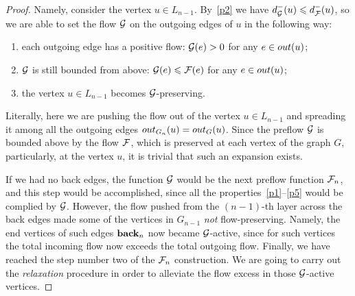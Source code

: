 \documentclass[12pt,oneside,a4paper]{amsart}
\begin{document}
\begin{proof}
        Namely, consider the vertex $u \in L_{n-1}$.
        By~\ref{p2} we have $d_{\cal{G}}^{-}(u) \leq d_{\flowpos}^{-}(u)$,
          so we are able to set the flow $\cal{G}$ on the outgoing edges of $u$ in the following way:
        \begin{enumerate}[label=\textbf{(\roman*)}]
          \item\label{posprop} each outgoing edge has a positive flow: $\cal{G}(e) > 0$ for any $e \in \eout(u)$;
          \item $\cal{G}$ is still bounded from above: $\cal{G}(e) \leq \flowpos(e)$ for any $e \in \eout(u)$;
          \item the vertex $u \in L_{n-1}$ becomes $\cal{G}$-preserving.
        \end{enumerate}
        \begin{remark}
          Literally, here we are pushing the flow out of the vertex $u \in L_{n-1}$ and spreading it among all the outgoing edges
            $\eout_{G_n}(u) = \eout_G(u)$.
          Since the preflow $\cal{G}$ is bounded above by the flow $\flowpos$, which is preserved at each vertex of the graph $G$,
            particularly, at the vertex $u$, it is trivial that such an expansion exists.
        \end{remark}
        If we had no back edges, the function $\cal{G}$ would be the next preflow function $\flowposn{n}$, and this step would be accomplished,
          since all the properties~\ref{p1}--\ref{p5} would be complied by $\cal{G}$.
        However, the flow pushed from the $(n-1)$-th layer across the back edges made some of the vertices in $G_{n-1}$ \emph{not} flow-preserving.
        Namely, the end vertices of such edges $\eback_{n}$ now became $\cal{G}$-active, since for such vertices
          the total incoming flow now exceeds the total outgoing flow.
        Finally, we have reached the step number two of the $\flowposn{n}$ construction.
        We are going to carry out the \emph{relaxation} procedure in order to alleviate the flow excess in those $\cal{G}$-active vertices.


\end{proof}
\end{document}
